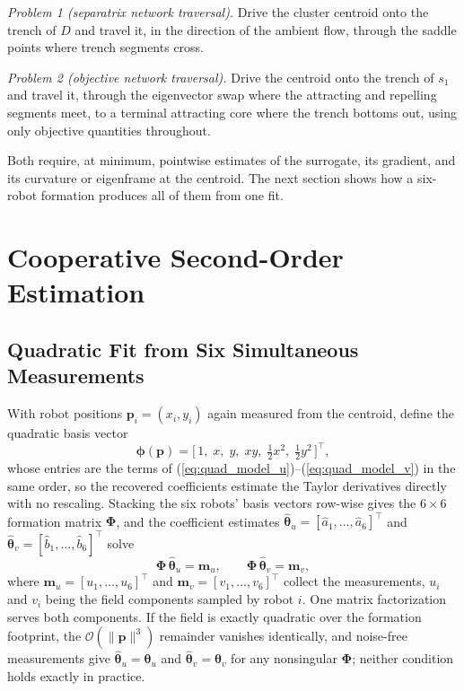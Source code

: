 \documentclass[lettersize,journal]{IEEEtran}
\begin{document}
\emph{Problem 1 (separatrix network traversal).} Drive the cluster
centroid onto the trench of $D$ and travel it, in the direction of the
ambient flow, through the saddle points where trench segments cross.

\emph{Problem 2 (objective network traversal).} Drive the centroid onto
the trench of $s_1$ and travel it, through the eigenvector swap where the
attracting and repelling segments meet, to a terminal attracting core
where the trench bottoms out, using only objective quantities throughout.

Both require, at minimum, pointwise estimates of the surrogate, its
gradient, and its curvature or eigenframe at the centroid. The next
section shows how a six-robot formation produces all of them from one
fit.

\section{Cooperative Second-Order Estimation}
\label{sec:estimation}

\subsection{Quadratic Fit from Six Simultaneous Measurements}

With robot positions $\mathbf{p}_i = (x_i, y_i)$ again measured from the
centroid, define the quadratic basis vector
\begin{equation}
    \boldsymbol{\phi}(\mathbf{p}) =
    \bigl[\,1, \; x, \; y, \; xy, \;
    \tfrac{1}{2}x^2, \; \tfrac{1}{2}y^2\,\bigr]^\top,
    \label{eq:basis}
\end{equation}
whose entries are the terms of
(\ref{eq:quad_model_u})--(\ref{eq:quad_model_v}) in the same order, so
the recovered coefficients estimate the Taylor derivatives directly with
no rescaling. Stacking the six robots' basis vectors row-wise gives
the $6 \times 6$ formation matrix $\boldsymbol{\Phi}$, and the coefficient
estimates $\hat{\boldsymbol{\theta}}_u = [\hat{a}_1, \ldots,
\hat{a}_6]^\top$ and $\hat{\boldsymbol{\theta}}_v = [\hat{b}_1, \ldots,
\hat{b}_6]^\top$ solve
\begin{equation}
    \boldsymbol{\Phi}\,\hat{\boldsymbol{\theta}}_u = \mathbf{m}_u, \qquad
    \boldsymbol{\Phi}\,\hat{\boldsymbol{\theta}}_v = \mathbf{m}_v,
    \label{eq:solve}
\end{equation}
where $\mathbf{m}_u = [u_1, \ldots, u_6]^\top$ and
$\mathbf{m}_v = [v_1, \ldots, v_6]^\top$ collect the measurements, $u_i$
and $v_i$ being the field components sampled by robot $i$. One matrix
factorization serves both components. If the field is exactly quadratic
over the formation footprint, the $\mathcal{O}(\|\mathbf{p}\|^3)$
remainder vanishes identically, and noise-free measurements give
$\hat{\boldsymbol{\theta}}_u = \boldsymbol{\theta}_u$ and
$\hat{\boldsymbol{\theta}}_v = \boldsymbol{\theta}_v$ for any nonsingular
$\boldsymbol{\Phi}$; neither condition holds exactly in practice.
\end{document}
